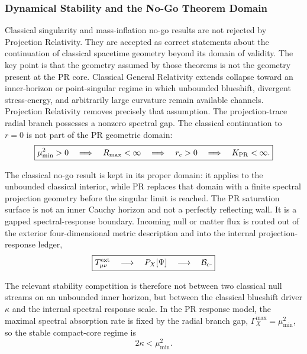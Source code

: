 \documentclass[11pt]{article}
\begin{document}
\subsubsection{Dynamical Stability and the No-Go Theorem Domain}
\label{sec:dynamic_core_stability}

Classical singularity and mass-inflation no-go \cite{poisson1990internal} 
results are not rejected by Projection Relativity. They are accepted as correct 
statements about the continuation of classical spacetime geometry beyond its 
domain of validity. The key point is that the geometry assumed by those theorems 
is not the geometry present at the PR core. Classical General Relativity extends 
collapse toward an inner-horizon or point-singular regime in which unbounded 
blueshift, divergent stress-energy, and arbitrarily large curvature remain 
available channels. Projection Relativity removes precisely that assumption. The 
projection-trace radial branch possesses a nonzero spectral gap. The classical 
continuation to \(r=0\) is not part of the PR geometric domain:
\begin{equation}
\boxed{
\mu_{\min}^2>0
\quad\Longrightarrow\quad
R_{\max}<\infty
\quad\Longrightarrow\quad
r_c>0
\quad\Longrightarrow\quad
K_{\rm PR}<\infty .
}
\end{equation}

The classical no-go result is kept in its proper domain: it applies to the 
unbounded classical interior, while PR replaces that domain with a finite 
spectral projection geometry before the singular limit is reached. The PR 
saturation surface is not an inner Cauchy horizon \cite{penrose1965} and not a 
perfectly reflecting wall. It is a gapped spectral-response boundary. Incoming 
null or matter flux is routed out of the exterior four-dimensional metric 
description and into the internal projection-response ledger,
\begin{equation}
\boxed{
T_{\mu\nu}^{\rm ext}
\quad\longrightarrow\quad
P_X[\Psi]
\quad\longrightarrow\quad
\mathcal B_c .
}
\end{equation}

The relevant stability competition is therefore not between two classical null 
streams on an unbounded inner horizon, but between the classical blueshift 
driver \(\kappa\) and the internal spectral response scale. In the PR response 
model, the maximal spectral absorption rate is fixed by the radial branch gap,
\(\Gamma_X^{\max}=\mu_{\min}^2\), so the stable compact-core regime is
\begin{equation}
\boxed{
2\kappa<\mu_{\min}^2 .
}
\end{equation}
\end{document}
